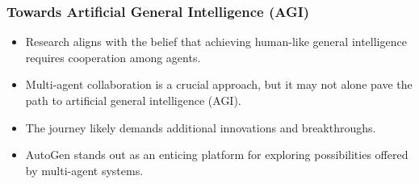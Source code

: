 \begin{frame}[fragile]\frametitle{Towards Artificial General Intelligence (AGI)}
  \begin{itemize}
    \item Research aligns with the belief that achieving human-like general intelligence requires cooperation among agents.
    \item Multi-agent collaboration is a crucial approach, but it may not alone pave the path to artificial general intelligence (AGI).
    \item The journey likely demands additional innovations and breakthroughs.
	\item AutoGen stands out as an enticing platform for exploring possibilities offered by multi-agent systems.
  \end{itemize}
\end{frame}
